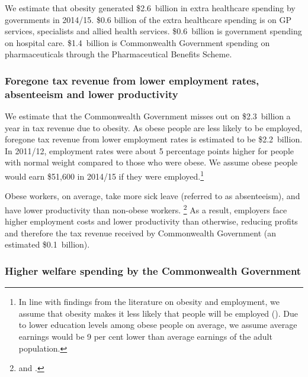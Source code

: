 \documentclass[embargoed]{grattan}
\begin{document}
We estimate that obesity generated \$2.6~billion in extra healthcare spending by governments in 2014/15. \$0.6 billion of the extra healthcare spending is on GP services, specialists and allied health services. \$0.6~billion is government spending on hospital care. \$1.4~billion is Commonwealth Government spending on pharmaceuticals through the Pharmaceutical Benefits Scheme.

\subsubsection{Foregone tax revenue from lower employment rates, absenteeism and lower productivity}\label{foregone-tax-revenue-from-lower-employment-rates-absenteeism-and-lower-productivity}

We estimate that the Commonwealth Government misses out on \$2.3~billion a year in tax revenue due to obesity. As obese people are less likely to be employed, foregone tax revenue from lower employment rates is estimated to be \$2.2~billion.
In 2011/12, employment rates were about 5 percentage points higher for people with normal weight compared to those who were obese.
We assume obese people would earn \$51,600 in 2014/15 if they were employed.\footnote{In line with findings from the literature on obesity and employment, we assume that obesity makes it less likely that people will be employed (\textcites{Boeckerman2016EffectWeightLabor}{Reichert2015Obesityweightloss}{Cawley2015economyscalesselective}{Rooth2009Obesityattractivenessdifferential}).
Due to lower education levels among obese people on average, we assume average earnings would be 9 per cent lower than average earnings of the adult population.}

Obese workers, on average, take more sick leave (referred to as absenteeism), and have lower productivity than non-obese workers.%
\footnote{\textcite{RepresentativesStandingCommitteeonHealth2009Weighingitup} and \textcite{Medibank2011SickWorkcost}.} As a result, employers face higher employment costs and lower productivity than otherwise, reducing profits and therefore the tax revenue received by Commonwealth Government (an estimated \$0.1~billion).

\subsubsection{Higher welfare spending by the Commonwealth Government }\label{higher-welfare-spending-by-the-commonwealth-government}
\end{document}
